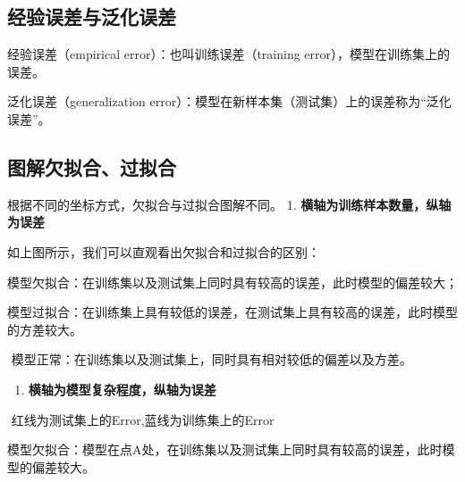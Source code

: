 
\subsection{经验误差与泛化误差}\label{ux7ecfux9a8cux8befux5deeux4e0eux6cdbux5316ux8befux5dee}

经验误差（empirical error）：也叫训练误差（training
error），模型在训练集上的误差。

泛化误差（generalization
error）：模型在新样本集（测试集）上的误差称为``泛化误差''。

\subsection{图解欠拟合、过拟合}\label{ux56feux89e3ux6b20ux62dfux5408ux8fc7ux62dfux5408}

根据不同的坐标方式，欠拟合与过拟合图解不同。 1.
\textbf{横轴为训练样本数量，纵轴为误差}


如上图所示，我们可以直观看出欠拟合和过拟合的区别：

​
模型欠拟合：在训练集以及测试集上同时具有较高的误差，此时模型的偏差较大；

​
模型过拟合：在训练集上具有较低的误差，在测试集上具有较高的误差，此时模型的方差较大。

​ 模型正常：在训练集以及测试集上，同时具有相对较低的偏差以及方差。

\begin{enumerate}
\def\labelenumi{\arabic{enumi}.}
\setcounter{enumi}{1}
\item
  \textbf{横轴为模型复杂程度，纵轴为误差}
\end{enumerate}


​ 红线为测试集上的Error,蓝线为训练集上的Error

​
模型欠拟合：模型在点A处，在训练集以及测试集上同时具有较高的误差，此时模型的偏差较大。

